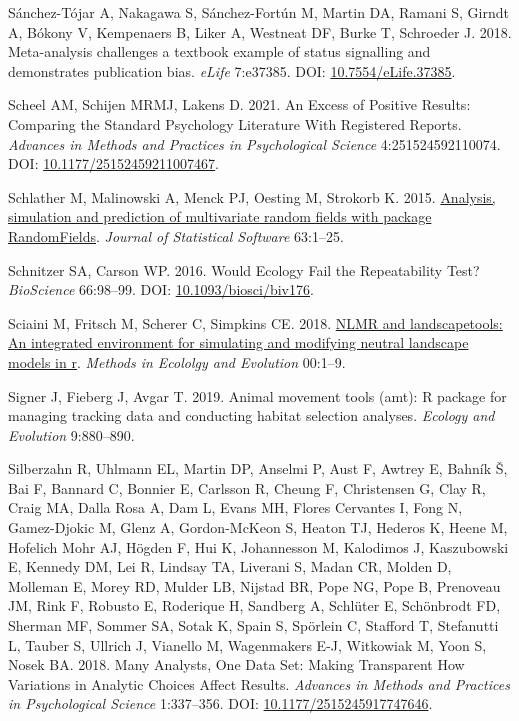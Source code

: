\documentclass[10pt,a4paper]{article}
\newlength{\cslhangindent}
\newlength{\cslentryspacingunit} %
\newenvironment{CSLReferences}[2] %
 {%
  \setlength{\parindent}{0pt}
  \ifodd #1
  \let\oldpar\par
  \def\par{\hangindent=\cslhangindent\oldpar}
  \fi
  \setlength{\parskip}{#2\cslentryspacingunit}
 }%
 {}
\begin{document}
\begin{CSLReferences}{1}{0}
\leavevmode{}%
Sánchez-Tójar A, Nakagawa S, Sánchez-Fortún M, Martin DA, Ramani S, Girndt A, Bókony V, Kempenaers B, Liker A, Westneat DF, Burke T, Schroeder J. 2018. Meta-analysis challenges a textbook example of status signalling and demonstrates publication bias. \emph{eLife} 7:e37385. DOI: \href{https://doi.org/10.7554/eLife.37385}{10.7554/eLife.37385}.

\leavevmode{}%
Scheel AM, Schijen MRMJ, Lakens D. 2021. An {Excess} of {Positive} {Results}: {Comparing} the {Standard} {Psychology} {Literature} {With} {Registered} {Reports}. \emph{Advances in Methods and Practices in Psychological Science} 4:251524592110074. DOI: \href{https://doi.org/10.1177/25152459211007467}{10.1177/25152459211007467}.

\leavevmode{}%
Schlather M, Malinowski A, Menck PJ, Oesting M, Strokorb K. 2015. \href{https://www.jstatsoft.org/v63/i08/}{Analysis, simulation and prediction of multivariate random fields with package {RandomFields}}. \emph{Journal of Statistical Software} 63:1--25.

\leavevmode{}%
Schnitzer SA, Carson WP. 2016. Would {Ecology} {Fail} the {Repeatability} {Test}? \emph{BioScience} 66:98--99. DOI: \href{https://doi.org/10.1093/biosci/biv176}{10.1093/biosci/biv176}.

\leavevmode{}%
Sciaini M, Fritsch M, Scherer C, Simpkins CE. 2018. \href{https://doi.org/10.1111/2041-210X.13076}{NLMR and landscapetools: An integrated environment for simulating and modifying neutral landscape models in r}. \emph{Methods in Ecololgy and Evolution} 00:1--9.

\leavevmode{}%
Signer J, Fieberg J, Avgar T. 2019. Animal movement tools (amt): R package for managing tracking data and conducting habitat selection analyses. \emph{Ecology and Evolution} 9:880--890.

\leavevmode{}%
Silberzahn R, Uhlmann EL, Martin DP, Anselmi P, Aust F, Awtrey E, Bahník Š, Bai F, Bannard C, Bonnier E, Carlsson R, Cheung F, Christensen G, Clay R, Craig MA, Dalla Rosa A, Dam L, Evans MH, Flores Cervantes I, Fong N, Gamez-Djokic M, Glenz A, Gordon-McKeon S, Heaton TJ, Hederos K, Heene M, Hofelich Mohr AJ, Högden F, Hui K, Johannesson M, Kalodimos J, Kaszubowski E, Kennedy DM, Lei R, Lindsay TA, Liverani S, Madan CR, Molden D, Molleman E, Morey RD, Mulder LB, Nijstad BR, Pope NG, Pope B, Prenoveau JM, Rink F, Robusto E, Roderique H, Sandberg A, Schlüter E, Schönbrodt FD, Sherman MF, Sommer SA, Sotak K, Spain S, Spörlein C, Stafford T, Stefanutti L, Tauber S, Ullrich J, Vianello M, Wagenmakers E-J, Witkowiak M, Yoon S, Nosek BA. 2018. Many {Analysts}, {One} {Data} {Set}: {Making} {Transparent} {How} {Variations} in {Analytic} {Choices} {Affect} {Results}. \emph{Advances in Methods and Practices in Psychological Science} 1:337--356. DOI: \href{https://doi.org/10.1177/2515245917747646}{10.1177/2515245917747646}.


\end{CSLReferences}
\end{document}
